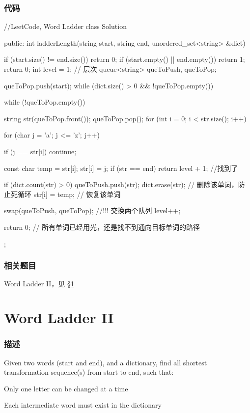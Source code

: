 \subsubsection{代码}
\begin{Code}
//LeetCode, Word Ladder
class Solution {
public:
    int ladderLength(string start, string end, unordered_set<string> &dict) {
        if (start.size() != end.size()) return 0;
        if (start.empty() || end.empty()) return 1; return 0;
        int level = 1;  // 层次
        queue<string> queToPush, queToPop;

        queToPop.push(start);
        while (dict.size() > 0 && !queToPop.empty()) {
            while (!queToPop.empty()) {
                string str(queToPop.front());
                queToPop.pop();
                for (int i = 0; i < str.size(); i++) {
                    for (char j = 'a'; j <= 'z'; j++) {
                        if (j == str[i]) continue;

                        const char temp = str[i];
                        str[i] = j;
                        if (str == end) return level + 1; //找到了

                        if (dict.count(str) > 0) {
                            queToPush.push(str);
                            dict.erase(str); // 删除该单词，防止死循环
                        }
                        str[i] = temp; // 恢复该单词
                    }
                }
            }
            swap(queToPush, queToPop); //!!! 交换两个队列
            level++;
        }
        return 0; // 所有单词已经用光，还是找不到通向目标单词的路径
    }
};
\end{Code}


\subsubsection{相关题目}

\begindot
\item Word Ladder II，见 \S \ref{sec:wordladderii}
\myenddot


\section{Word Ladder II} %
\label{sec:wordladderii}


\subsubsection{描述}
Given two words (start and end), and a dictionary, find all shortest transformation sequence(s) from start to end, such that:
\begindot
\item Only one letter can be changed at a time
\item Each intermediate word must exist in the dictionary
\myenddot

